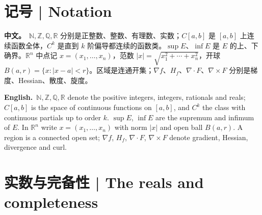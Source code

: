 \documentclass[UTF8,11pt,a4paper]{ctexart}
\newcommand{\R}{\mathbb{R}}
\newcommand{\N}{\mathbb{N}}
\newcommand{\Z}{\mathbb{Z}}
\newcommand{\Q}{\mathbb{Q}}
\newcommand{\BOTH}[2]{\par\noindent\textbf{中文。}\ #1\par\noindent\textbf{English.}\ #2\par}
\begin{document}
\section*{记号 | Notation}
\BOTH{$\N,\Z,\Q,\R$ 分别是正整数、整数、有理数、实数；$C[a,b]$ 是 $[a,b]$ 上连续函数全体，$C^k$ 是直到 $k$ 阶偏导都连续的函数类。$\sup E$、$\inf E$ 是 $E$ 的上、下确界。$\R^n$ 中点记 $x=(x_1,\ldots,x_n)$，范数 $|x|=\sqrt{x_1^2+\cdots+x_n^2}$，开球 $B(a,r)=\{x:|x-a|<r\}$。区域是连通开集；$\nabla f$、$H_f$、$\nabla\cdot F$、$\nabla\times F$ 分别是梯度、Hessian、散度、旋度。}{$\N,\Z,\Q,\R$ denote the positive integers, integers, rationals and reals; $C[a,b]$ is the space of continuous functions on $[a,b]$, and $C^k$ the class with continuous partials up to order $k$. $\sup E$, $\inf E$ are the supremum and infimum of $E$. In $\R^n$ write $x=(x_1,\ldots,x_n)$ with norm $|x|$ and open ball $B(a,r)$. A region is a connected open set; $\nabla f$, $H_f$, $\nabla\cdot F$, $\nabla\times F$ denote gradient, Hessian, divergence and curl.}

\section{实数与完备性 | The reals and completeness}
\end{document}
